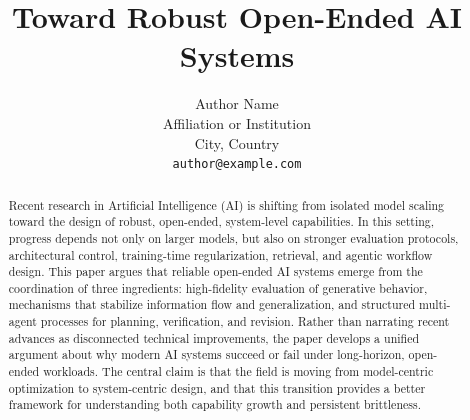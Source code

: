 \documentclass{article}
\title{Toward Robust Open-Ended AI Systems}
\author{
  Author Name \\
  Affiliation or Institution \\
  City, Country \\
  \texttt{author@example.com} \\
}
\begin{document}
\maketitle

\begin{abstract}
Recent research in Artificial Intelligence (AI) is shifting from isolated model scaling toward the design of robust, open-ended, system-level capabilities. In this setting, progress depends not only on larger models, but also on stronger evaluation protocols, architectural control, training-time regularization, retrieval, and agentic workflow design. This paper argues that reliable open-ended AI systems emerge from the coordination of three ingredients: high-fidelity evaluation of generative behavior, mechanisms that stabilize information flow and generalization, and structured multi-agent processes for planning, verification, and revision. Rather than narrating recent advances as disconnected technical improvements, the paper develops a unified argument about why modern AI systems succeed or fail under long-horizon, open-ended workloads. The central claim is that the field is moving from model-centric optimization to system-centric design, and that this transition provides a better framework for understanding both capability growth and persistent brittleness.
\end{abstract}





\end{document}
